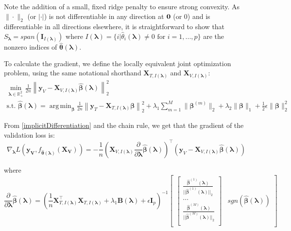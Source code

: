 \documentclass{statsoc}
\DeclareMathOperator*{\argmin}{arg\,min}
\begin{document}
Note the addition of a small, fixed ridge penalty to ensure strong convexity. As $\|\cdot\|_2$ (or $|\cdot|$) is not differentiable in any direction at ${\bf 0}$ (or $0$) and is differentiable in all directions elsewhere, it is straightforward to show that $S_{\boldsymbol \lambda} = span(\boldsymbol I_{I(\boldsymbol\lambda)})$ where $I(\boldsymbol\lambda) = \{i | \hat{\theta}_i(\boldsymbol\lambda) \ne 0 \text{ for } i=1,...,p \}$ are the nonzero indices of $\hat{\boldsymbol{\theta}}(\boldsymbol{\lambda})$.

To calculate the gradient, we define the locally equivalent joint optimization problem, using the same notational shorthand $\boldsymbol{X}_{T, I(\boldsymbol\lambda)}$ and $\boldsymbol{X}_{V, I(\boldsymbol\lambda)}$:
\begin{equation}
\begin{array}{c}
\min_{\boldsymbol{\lambda} \in \mathbb{R}^2_{+}} \frac{1}{2n} \left \| \boldsymbol{y}_V - \boldsymbol X_{V,I(\boldsymbol\lambda)} \hat{\boldsymbol\beta}(\boldsymbol{\lambda}) \right \|^2_2 \\
\text{s.t. }
\hat{\boldsymbol{\beta}}(\boldsymbol{\lambda}) = \argmin_{\boldsymbol \beta}
\frac{1}{2n} \left \| \boldsymbol{y}_T - \boldsymbol{X}_{T, I(\boldsymbol\lambda)} \boldsymbol \beta \right \|^2_2
+ \lambda_1 \sum_{m=1}^M \| \boldsymbol \beta^{(m)} \|_2
+ \lambda_2 \| \boldsymbol \beta \|_1
+ \frac{1}{2}\epsilon \| \boldsymbol \beta \|_2^2
\end{array}
\end{equation}

From \eqref{implicitDifferentiation} and the chain rule, we get that the gradient of the validation loss is:
\begin{equation}
\nabla_{\boldsymbol \lambda} L(\boldsymbol{y_V}, f_{\hat{\boldsymbol{\theta}}(\boldsymbol{\lambda})}(\boldsymbol{X_V})) =
- \frac{1}{n}
\left (
\boldsymbol{X}_{V, I(\boldsymbol\lambda)}
\frac{\partial}{\partial \boldsymbol\lambda} \hat{\boldsymbol{\beta}}(\boldsymbol{\lambda})
\right )^\top
\left (
\boldsymbol{y}_V - \boldsymbol{X}_{V, I(\boldsymbol\lambda)} \hat{\boldsymbol{\beta}}(\boldsymbol{\lambda})
\right )
\end{equation}

where 
\begin{equation}
\frac{\partial}{\partial \boldsymbol \lambda} \hat{\boldsymbol{\beta}}(\boldsymbol{\lambda})
=
\left (
\frac{1}{n} \boldsymbol{X}_{T, I(\boldsymbol\lambda)}^\top \boldsymbol{X}_{T, I(\boldsymbol\lambda)}
+ \lambda_1 \boldsymbol{B}(\boldsymbol\lambda)
+ \epsilon \boldsymbol I_p
\right ) ^{-1}
\begin{bmatrix}
\begin{bmatrix}
\frac{\hat{\boldsymbol{\beta}}^{(1)}(\boldsymbol \lambda)}{||\hat{\boldsymbol{\beta}}^{(1)} (\boldsymbol \lambda)||_2}\\
...\\
\frac{\hat{\boldsymbol \beta}^{(M)} (\boldsymbol \lambda)}{||\hat{\boldsymbol{\beta}}^{(M)}(\boldsymbol \lambda)||_2}\\
\end{bmatrix}
&
sgn(\hat{\boldsymbol{\beta}}(\boldsymbol{\lambda}))
\end{bmatrix}
\end{equation}
\end{document}
